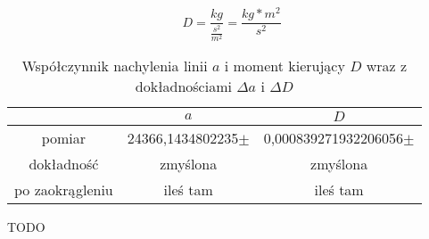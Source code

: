 \documentclass[10pt,a4paper]{article}
\begin{document}
$$
D=\frac{kg}{\frac{s^2}{m^2}}=\frac{kg*m^2}{s^2}
$$

\begin{table}[!h]
\centering
\begin{tabular}{|cc||c|}
\multicolumn{1}{c}{} & \multicolumn{1}{c}{$a$} & \multicolumn{1}{c}{$D$}\\
\hline
pomiar & 24366,1434802235$\pm$& 0,000839271932206056$\pm$\\
\hline
dokładność & zmyślona & zmyślona\\
\hline
po zaokrągleniu & ileś tam  & ileś tam \\
\hline
\end{tabular}
\caption{Współczynnik nachylenia linii $a$ i moment kierujący $D$ wraz z dokładnościami $\Delta a$ i $\Delta D$}
\end{table}

TODO
\end{document}
